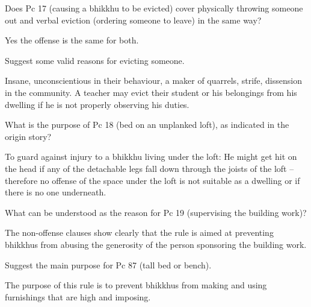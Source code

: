 \bigskip


Does Pc 17 (causing a bhikkhu to be evicted) cover physically throwing someone out and verbal
eviction (ordering someone to leave) in the same way?

\begin{solution}
  Yes the offense is the same for both.
\end{solution}

\bigskip

Suggest some valid reasons for evicting someone.

\begin{solution}
  Insane, unconscientious in their behaviour, a maker of quarrels, strife,
  dissension in the community. A teacher may evict their student or his
  belongings from his dwelling if he is not properly observing his duties.
\end{solution}

\bigskip


What is the purpose of Pc 18 (bed on an unplanked loft), as indicated in the origin story?

\begin{solution}
  To guard against injury to a bhikkhu living under the loft: He might get hit
  on the head if any of the detachable legs fall down through the joists of the
  loft – therefore no offense of the space under the loft is not suitable as a
  dwelling or if there is no one underneath.
\end{solution}

\bigskip


What can be understood as the reason for Pc 19 (supervising the building work)?

\begin{solution}
  The non-offense clauses show clearly that the rule is aimed at preventing
  bhikkhus from abusing the generosity of the person sponsoring the building
  work.
\end{solution}

\bigskip


Suggest the main purpose for Pc 87 (tall bed or bench).

\begin{solution}
  The purpose of this rule is to prevent bhikkhus from making and using
  furnishings that are high and imposing.
\end{solution}

